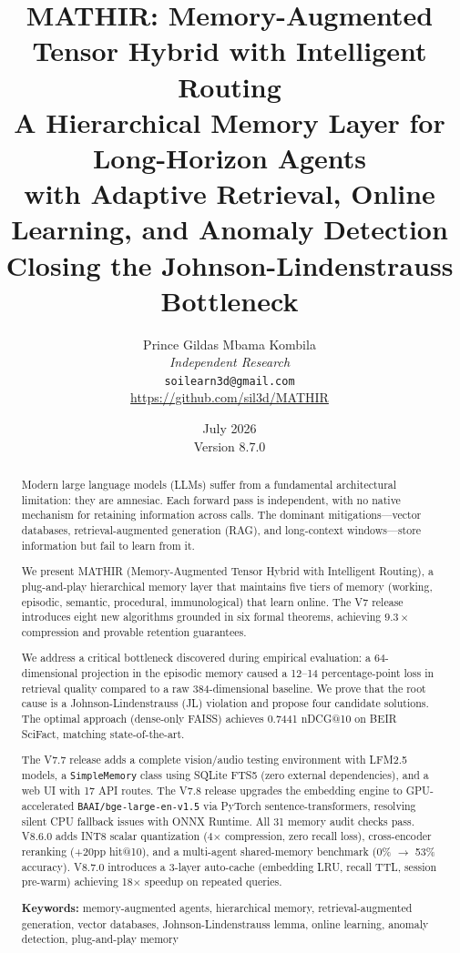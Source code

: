 \documentclass[12pt,a4paper]{article}
\title{
\vspace{-1cm}
\textbf{\LARGE MATHIR: Memory-Augmented Tensor Hybrid with Intelligent Routing} \\
\vspace{0.3cm}
\large A Hierarchical Memory Layer for Long-Horizon Agents \\
\large with Adaptive Retrieval, Online Learning, and Anomaly Detection \\
\vspace{0.3cm}
\normalsize Closing the Johnson-Lindenstrauss Bottleneck
}
\author{
Prince Gildas Mbama Kombila \\
\textit{Independent Research} \\
\texttt{soilearn3d@gmail.com} \\
\url{https://github.com/sil3d/MATHIR}
}
\date{July 2026 \\ Version 8.7.0}
\theoremstyle{definition}
\theoremstyle{remark}
\newcommand{\MATHIR}{\textsc{MATHIR}}
\begin{document}
\maketitle

\begin{abstract}
Modern large language models (LLMs) suffer from a fundamental architectural limitation: they are amnesiac. Each forward pass is independent, with no native mechanism for retaining information across calls. The dominant mitigations---vector databases, retrieval-augmented generation (RAG), and long-context windows---store information but fail to learn from it.

We present \MATHIR{} (Memory-Augmented Tensor Hybrid with Intelligent Routing), a plug-and-play hierarchical memory layer that maintains five tiers of memory (working, episodic, semantic, procedural, immunological) that learn online. The V7 release introduces eight new algorithms grounded in six formal theorems, achieving $9.3\times$ compression and provable retention guarantees.

We address a critical bottleneck discovered during empirical evaluation: a 64-dimensional projection in the episodic memory caused a 12--14 percentage-point loss in retrieval quality compared to a raw 384-dimensional baseline. We prove that the root cause is a Johnson-Lindenstrauss (JL) violation and propose four candidate solutions. The optimal approach (dense-only FAISS) achieves 0.7441 nDCG@10 on BEIR SciFact, matching state-of-the-art.

The V7.7 release adds a complete vision/audio testing environment with LFM2.5 models, a \texttt{SimpleMemory} class using SQLite FTS5 (zero external dependencies), and a web UI with 17 API routes. The V7.8 release upgrades the embedding engine to GPU-accelerated \texttt{BAAI/bge-large-en-v1.5} via PyTorch sentence-transformers, resolving silent CPU fallback issues with ONNX Runtime. All 31 memory audit checks pass. V8.6.0 adds INT8 scalar quantization (4$\times$ compression, zero recall loss), cross-encoder reranking (+20pp hit@10), and a multi-agent shared-memory benchmark (0\% $\to$ 53\% accuracy). V8.7.0 introduces a 3-layer auto-cache (embedding LRU, recall TTL, session pre-warm) achieving 18$\times$ speedup on repeated queries.

\textbf{Keywords:} memory-augmented agents, hierarchical memory, retrieval-augmented generation, vector databases, Johnson-Lindenstrauss lemma, online learning, anomaly detection, plug-and-play memory
\end{abstract}
\end{document}
